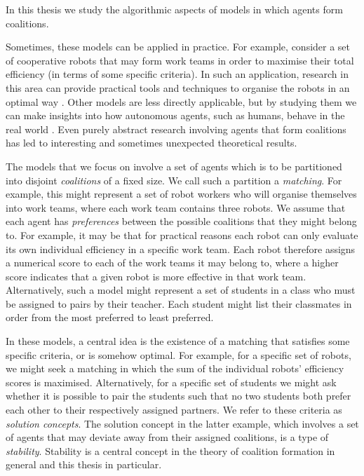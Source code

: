 
In this thesis we study the algorithmic aspects of models in which agents form coalitions.

Sometimes, these models can be applied in practice. For example, consider a set of cooperative robots that may form work teams in order to maximise their total efficiency (in terms of some specific criteria). In such an application, research in this area can provide practical tools and techniques to organise the robots in an optimal way \cite{IJangHedonicGamesRobots2018}. Other models are less directly applicable, but by studying them we can make insights into how autonomous agents, such as humans, behave in the real world \cite{aumann1964bargaining,Peters2008}. Even purely abstract research involving agents that form coalitions has led to interesting and sometimes unexpected theoretical results.

The models that we focus on involve a set of agents which is to be partitioned into disjoint \emph{coalitions} of a fixed size. We call such a partition a \emph{matching}. For example, this might represent a set of robot workers who will organise themselves into work teams, where each work team contains three robots. We assume that each agent has \emph{preferences} between the possible coalitions that they might belong to. For example, it may be that for practical reasons each robot can only evaluate its own individual efficiency in a specific work team. Each robot therefore assigns a numerical score to each of the work teams it may belong to, where a higher score indicates that a given robot is more effective in that work team. Alternatively, such a model might represent a set of students in a class who must be assigned to pairs by their teacher. Each student might list their classmates in order from the most preferred to least preferred.

In these models, a central idea is the existence of a matching that satisfies some specific criteria, or is somehow optimal. For example, for a specific set of robots, we might seek a matching in which the sum of the individual robots' efficiency scores is maximised. Alternatively, for a specific set of students we might ask whether it is possible to pair the students such that no two students both prefer each other to their respectively assigned partners. We refer to these criteria as \emph{solution concepts}. The solution concept in the latter example, which involves a set of agents that may deviate away from their assigned coalitions, is a type of \emph{stability}. Stability is a central concept in the theory of coalition formation in general and this thesis in particular. 

